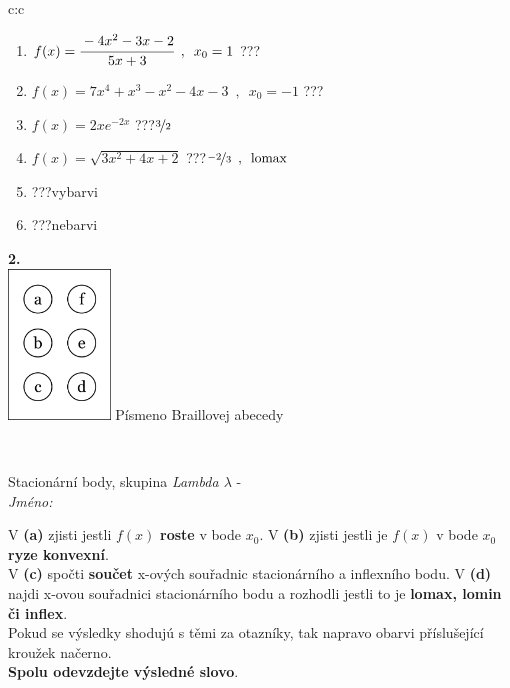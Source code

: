 \documentclass[10pt]{report}
\begin{document}
\begin{tabular}{c:c}
\begin{minipage}[c][104.5mm][t]{0.5\linewidth}
\begin{center}
\begin{minipage}{0.79\linewidth}
\begin{center}
\begin{varwidth}{\linewidth}
\begin{enumerate}
\item $f(x)=\cfrac{-4x^2-3x-2}{5x+3}\enspace , \enspace x_0=1$\quad \dotfill\; ???\;\dotfill \quad {}
\item $f(x)=7x^4+x^3-x^2-4x-3\enspace , \enspace x_0=-1$\quad \dotfill\; ???\;\dotfill \quad {}
\item $f(x)=2xe^{-2x}$\quad \dotfill\; ???\;\dotfill \quad $\nicefrac{3}{2}$
\item $f(x)=\sqrt{3x^2+4x+2}$\quad \dotfill\; ???\;\dotfill \quad $\nicefrac{-2}{3}\enspace , \enspace\mathrm{lomax}$
\item \quad \dotfill\; ???\;\dotfill \quad vybarvi
\item \quad \dotfill\; ???\;\dotfill \quad nebarvi
\end{enumerate}
\end{varwidth}
\end{center}
\end{minipage}
\begin{minipage}{0.20\linewidth}
\begin{center}
{\Huge\bfseries 2.} \\[2mm]
\includegraphics[height=40mm]{../images/braille.png}
{\small Písmeno Braillovej abecedy}
\end{center}
\end{minipage}
\end{center}
\end{minipage}
\\ \hdashline
\begin{minipage}[c][104.5mm][t]{0.5\linewidth}
\begin{center}
\vspace{7mm}
{\huge Stacionární body, skupina \textit{Lambda $\lambda$} -}\\[5mm]
\textit{Jméno:}\phantom{xxxxxxxxxxxxxxxxxxxxxxxxxxxxxxxxxxxxxxxxxxxxxxxxxxxxxxxxxxxxxxxxx}\\[5mm]
\begin{minipage}{0.95\linewidth}
\begin{center}
{\small V \textbf{(a)} zjisti jestli $f(x)$ \textbf{roste} v bode $x_0$. V \textbf{(b)} zjisti jestli je $f(x)$ v bode $x_0$ \textbf{ryze konvexní}.\\V \textbf{(c)} spočti \textbf{součet} x-ových souřadnic stacionárního a inflexního bodu. V \textbf{(d)} najdi x-ovou souřadnici stacionárního bodu a rozhodli jestli to je \textbf{lomax, lomin či inflex}.\\Pokud se výsledky shodujú s těmi za otazníky, tak napravo obarvi příslušející kroužek načerno.\\\textbf{Spolu odevzdejte výsledné slovo}}.

\end{center}
\end{minipage}
\end{center}
\end{minipage}
\end{tabular}
\end{document}
